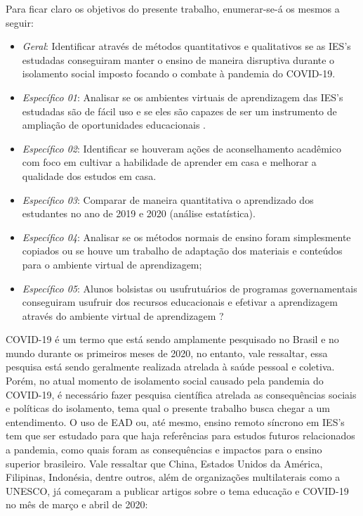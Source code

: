 \documentclass[
	arial,
	12pt,				%
	openright,			%
	twoside,			%
	a4paper,			%
	chapter=TITLE,		%
	english,			%
	french,				%
	spanish,			%
	brazil,				%
	]{abntex2}
\begin{document}
Para ficar claro os objetivos do presente trabalho, enumerar-se-á os mesmos a seguir:
\begin{itemize}\label{objetivos}

  \item \textit{Geral}: Identificar através de métodos quantitativos e qualitativos   se as IES's estudadas conseguiram manter o ensino de maneira disruptiva durante o isolamento social imposto focando o combate à pandemia  do COVID-19.
  \item \textit{Específico 01}: Analisar se os ambientes virtuais de aprendizagem das IES's estudadas são de fácil uso e se eles são capazes de ser um instrumento de ampliação de oportunidades educacionais \cite{elielCruz}.
  \item \textit{Específico 02}: Identificar se houveram ações de aconselhamento acadêmico com foco em cultivar a habilidade de aprender em casa e melhorar a qualidade dos estudos em casa.
  \item \textit{Específico 03}: Comparar de maneira quantitativa o aprendizado dos estudantes no ano de 2019 e 2020 (análise estatística).
  \item \textit{Específico 04}: Analisar se os métodos normais de ensino foram simplesmente copiados ou se houve um trabalho de adaptação dos materiais e conteúdos para o ambiente virtual de aprendizagem;
  \item \textit{Específico 05}: Alunos bolsistas ou usufrutuários de programas governamentais conseguiram usufruir dos recursos educacionais e efetivar a aprendizagem através do ambiente virtual de aprendizagem ?

\end{itemize}

COVID-19 é um termo que está sendo amplamente pesquisado no Brasil e no mundo \cite{googleTrends} durante os primeiros meses de 2020, no entanto, vale ressaltar, essa pesquisa está sendo geralmente realizada atrelada à saúde pessoal e coletiva. Porém, no atual momento de isolamento social causado pela pandemia do COVID-19, é necessário fazer pesquisa científica atrelada as consequências sociais e políticas do isolamento, tema qual o presente trabalho busca chegar a um entendimento. O uso de 
EAD ou, até mesmo, ensino remoto síncrono em IES's tem que ser estudado para que haja referências para estudos futuros relacionados a pandemia, como quais foram as consequências e impactos para o ensino superior  brasileiro. 
Vale ressaltar que China, Estados Unidos da América, Filipinas, Indonésia, dentre outros, além de organizações multilaterais como a UNESCO, já começaram a publicar artigos sobre o tema educação e COVID-19 no mês de março e 
abril de 2020:
\end{document}
